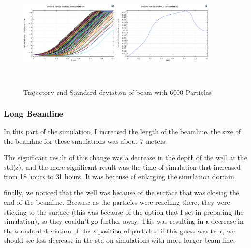 \documentclass[12pt,a4paper]{article}
\begin{document}
\begin{figure}[h!]
\centering
\includegraphics[width=50mm, height=50mm]{sim-in-6000}
\includegraphics[width=50mm, height=50mm]{sim-std-6000}
\caption{Trajectory and Standard deviation of beam with 6000 Particles}
\label{short}
\end{figure}

\subsubsection{Long Beamline}
In this part of the simulation, I increased the length of the beamline. the size of the beamline for these simulations was about 7 meters. 

The significant result of this change was a decrease in the depth of the well at the std(z), and the more significant result was the time of simulation that increased from 18 hours to 31 hours. It was because of enlarging the simulation domain.

 finally, we noticed that the well was because of the surface that was closing the end of the beamline. Because as the particles were reaching there, they were sticking to the surface (this was because of the option that I set in preparing the simulation), so they couldn't go further away. This was resulting in a decrease in the standard deviation of the z position of particles. if this guess was true, we should see less decrease in the std on simulations with more longer beam line.
 
\end{document}
